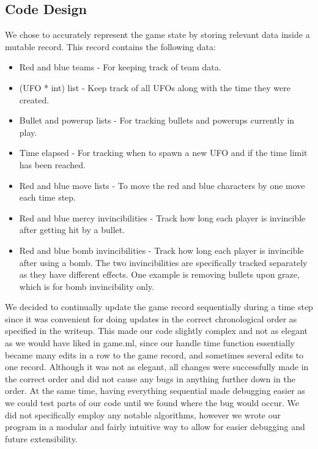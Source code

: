 \documentclass{article}
\begin{document}
\subsection{Code Design}
We chose to accurately represent the game state by storing relevant data inside a mutable record. This record contains the following data:
\begin{itemize} 
\item Red and blue teams - For keeping track of team data. 
\item (UFO * int) list - Keep track of all UFOs along with the time they were created. 
\item Bullet and powerup lists - For tracking bullets and powerups currently in play. 
\item Time elapsed - For tracking when to spawn a new UFO and if the time limit has been reached. 
\item Red and blue move lists - To move the red and blue characters by one move each time step. 
\item Red and blue mercy invincibilities - Track how long each player is invincible after getting hit by a bullet. 
\item Red and blue bomb invincibilities - Track how long each player is invincible after using a bomb. The two invincibilities are specifically tracked separately as they have different effects. One example is removing bullets upon graze, which is for bomb invincibility only. 
\end{itemize}

We decided to continually update the game record sequentially during a time step since it was convenient for doing updates in the correct chronological order as specified in the writeup. This made our code slightly complex and not as elegant as we would have liked in game.ml, since our handle time function essentially became many edits in a row to the game record, and sometimes several edits to one record. Although it was not as elegant, all changes were successfully made in the correct order and did not cause any bugs in anything further down in the order. At the same time, having everything sequential made debugging easier as we could test parts of our code until we found where the bug would occur. We did not specifically employ any notable algorithms, however we wrote our program in a modular and fairly intuitive way to allow for easier debugging and future extensibility. 
\end{document}
